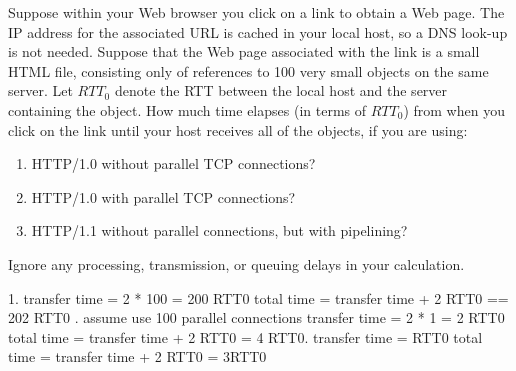 \documentclass{report}
\begin{document}
\newpage




\begin{problem}
Suppose within your Web browser you click on a link to obtain a Web page. The IP address for the associated  URL is cached in your local host, so a DNS look-up is not needed. Suppose that the Web page associated with the link is a small HTML file, consisting only of references to 100 very small objects on the same server. Let $RTT_0$ denote the RTT between the local host and the server containing the object. How much time elapses (in terms of $RTT_0$) from when you click on the link until your host receives all of the objects, if you are using:
\begin{enumerate}
		\item HTTP/1.0 without parallel TCP connections?
		\item HTTP/1.0 with parallel TCP connections?
		\item HTTP/1.1 without parallel connections, but with pipelining?
\end{enumerate}

Ignore any processing, transmission, or queuing delays in your calculation.\\

  \begin{answer}{37em}
  1. \newline
  transfer time = 2 * 100 = 200 RTT0\newline
  total time = transfer time + 2 RTT0 == 202 RTT0 \newline {}. \newline
  assume use 100 parallel connections\newline
  transfer time = 2 * 1 = 2 RTT0\newline
  total time = transfer time + 2 RTT0 = 4 RTT0\newline {}.\newline
  transfer time = RTT0\newline
  total time = transfer time + 2 RTT0 = 3RTT0\newline
  \end{answer}

\end{problem}

\newpage
\end{document}
